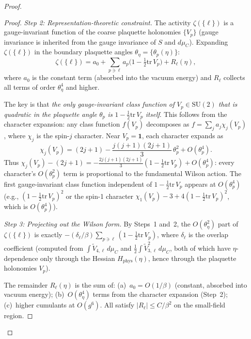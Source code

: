 \documentclass[11pt]{article}
\theoremstyle{definition}
\newcommand{\SU}{\mathrm{SU}}
\newcommand{\tr}{\mathrm{tr}}
\begin{document}
\begin{proof}
\begin{proof}
\emph{Step 2: Representation-theoretic constraint.}
The activity $\zeta(\{\ell\})$ is a gauge-invariant function of
the coarse plaquette holonomies $\{V_p\}$ (gauge invariance is
inherited from the gauge invariance of $S$ and $d\mu_C$).
Expanding $\zeta(\{\ell\})$ in the boundary plaquette angles
$\theta_\eta=\{\theta_p(\eta)\}$:
\[
\zeta(\{\ell\})=a_0+\sum_{p\ni\ell}a_p
\bigl(1-\tfrac{1}{2}\tr\,V_p\bigr)+R_\ell(\eta),
\]
where $a_0$ is the constant term (absorbed into the vacuum energy)
and $R_\ell$ collects all terms of order $\theta_\eta^4$ and higher.

The key is that \emph{the only gauge-invariant class function
of $V_p\in\SU(2)$ that is quadratic in the plaquette angle
$\theta_p$ is $1-\frac{1}{2}\tr\,V_p$ itself}.  This follows
from the character expansion: any class function $f(V_p)$
decomposes as $f=\sum_j a_j\chi_j(V_p)$, where
$\chi_j$ is the spin-$j$ character.  Near
$V_p=\mathbf{1}$, each character expands as
\begin{equation}\label{eq:character-expansion}
\chi_j(V_p)=(2j+1)-\frac{j(j+1)(2j+1)}{3}\,\theta_p^2
+O(\theta_p^4).
\end{equation}
Thus $\chi_j(V_p)-(2j+1)=-\frac{2j(j+1)(2j+1)}{3}
(1-\frac{1}{2}\tr\,V_p)+O(\theta_p^4)$:
every character's $O(\theta_p^2)$ term is proportional to
the fundamental Wilson action.  The first gauge-invariant class
function independent of $1-\frac{1}{2}\tr\,V_p$ appears at
$O(\theta_p^4)$ (e.g.,
$(1-\frac{1}{2}\tr\,V_p)^2$ or the spin-1 character
$\chi_1(V_p)-3+4(1-\frac{1}{2}\tr\,V_p)^2$, which is
$O(\theta_p^4)$).

\emph{Step 3: Projecting out the Wilson form.}
By Steps~1 and~2, the $O(\theta_\eta^2)$ part of
$\zeta(\{\ell\})$ is exactly
$-(\delta_\ell/\beta)\sum_{p\ni\ell}(1-\frac{1}{2}\tr\,V_p)$,
where $\delta_\ell$ is the overlap coefficient (computed from
$\int\widetilde{V}_{4,\ell}\,d\mu_C$ and
$\frac{1}{2}\int\widetilde{V}_{3,\ell}^2\,d\mu_C$,
both of which have $\eta$-dependence only through the
Hessian $H_{\mathrm{phys}}(\eta)$, hence through the plaquette
holonomies $V_p$).

The remainder $R_\ell(\eta)$ is the sum of:
(a)~$a_0=O(1/\beta)$ (constant, absorbed into vacuum energy);
(b)~$O(\theta_\eta^4)$ terms from the character expansion
(Step~2); (c)~higher cumulants at $O(g^6)$.  All satisfy
$|R_\ell|\le C/\beta^2$ on the small-field region.
\end{proof}


\end{proof}
\end{document}
